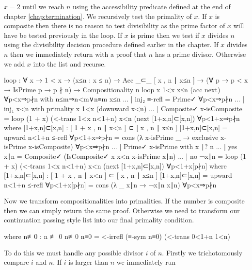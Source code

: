 \documentclass[./Thesis.tex]{subfiles}
\begin{document}
$x = 2$
until we reach $n$ using the accessibility predicate defined at the end of chapter
\ref{chap:termination}. We recursively test the primality of $x$. If $x$ is
composite then there is no reason to test divisibility as the prime factor of
$x$ will have be tested previously in the loop. If $x$ is prime then we test if
$x$ divides $n$ using the divisibility decision procedure defined earlier in the
chapter. If $x$ divides $n$ then we immediately return with a proof that $n$ has
a prime divisor. Otherwise we add $x$ into the list and recurse.
\begin{code}
    loop
      : ∀ x → 1 < x → (x≤n : x ≤ n) → Acc _⊂_ [ x , n ∣ x≤n ]
      → (∀ {p} → p < x → IsPrime p → p ∤ n)
      → Compositionality n
    loop x 1<x x≤n (acc next) ∀p<x⇒p∤n with n≤m⇒n<m∨n≡m x≤n
    ... | inj₂ ≡-refl = Prime✓ ∀p<x⇒p∤n
    ... | inj₁ x<n with primality x 1<x (downward x<n)
    ...   | Composite✓ x-isComposite
          = loop (1 + x) (<-trans 1<x n<1+n) x<n (next [1+x,n]⊂[x,n]) ∀p<1+x⇒p∤n
            where
            [1+x,n]⊂[x,n] : [ 1 + x , n ∣ x<n ] ⊂ [ x , n ∣ x≤n ]
            [1+x,n]⊂[x,n] = upward n<1+n ≤-refl
            ∀p<1+x⇒p∤n = cons (λ x-isPrime _ → exclusive x-isPrime x-isComposite) ∀p<x⇒p∤n
    ...   | Prime✓ x-isPrime with x ∣? n
    ...     | yes x∣n = Composite✓ (IsComposite✓ x x<n x-isPrime x∣n)
    ...     | no ¬x∣n = loop (1 + x) (<-trans 1<x n<1+n) x<n (next [1+x,n]⊂[x,n]) ∀p<1+x[p∤n]
            where
            [1+x,n]⊂[x,n] : [ 1 + x , n ∣ x<n ] ⊂ [ x , n ∣ x≤n ]
            [1+x,n]⊂[x,n] = upward n<1+n ≤-refl
            ∀p<1+x[p∤n] = cons (λ _ x∣n → ¬x∣n x∣n) ∀p<x⇒p∤n
\end{code}
Now we transform compositionalities into primalities. If the number is
composite then we can simply return the same proof. Otherwise we need to
transform our continuation passing style list into our final primality condition.
\begin{code}[hide]
    where
    n≢0 : n ≢ 0
    n≢0 n≡0 = <-irrefl (≡-sym n≡0) (<-trans 0<1+n 1<n)
\end{code}
To do this we must handle any possible divisor $i$ of $n$. Firstly we
trichotomously compare $i$ and $n$. If $i$ is larger than $n$ we immediately run
\end{document}

